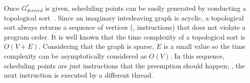 %
Once $G^{*}_{derived}$ is given, scheduling points can be easily
generated by conducting a topological sort~\cite{topologicalsort}.
%
Since an imaginary interleaving graph is acyclic, a topological sort
always returns a sequence of vertices (\ie, instructions) that does
not violate a program order.
%
It is well known that the time complexity of a topological sort is
$O(V+E)$. Considering that the graph is sparse, $E$ is a small value
so the time complexity can be asymptotically considered as $O(V)$.
%
In this sequence, scheduling points are just instructions that the
preemption should happen; \ie, the next instruction is executed by a
different thread.




